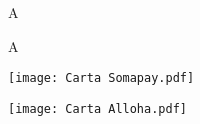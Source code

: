 \documentclass[10pt,a4paper,ragged2e,withhyper]{altacv}
\begin{document}
\begin{paracol}{2}
\begin{pessoal}{A}  %

\end{pessoal}

\begin{software}{A}  %
	
\end{software}

%

%

%

%

\end{paracol}

%		

\begin{paracol}{1}
	\texttt{[image: Carta Somapay.pdf]}\\
\end{paracol}

\begin{paracol}{1}
	\texttt{[image: Carta Alloha.pdf]}\\
\end{paracol}
\end{document}
